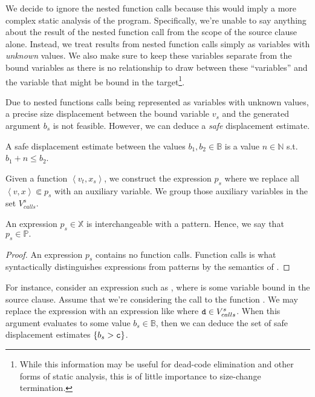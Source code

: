 We decide to ignore the nested function calls because this would imply a more
complex static analysis of the program. Specifically, we're unable to say
anything about the result of the nested function call from the scope of the
source clause alone. Instead, we treat results from nested function calls
simply as variables with \emph{unknown} values. We also make sure to keep these
variables separate from the bound variables as there is no relationship to draw
between these ``variables'' and the variable that might be bound in the
target\footnote{While this information may be useful for dead-code elimination
and other forms of static analysis, this is of little importance to size-change
termination.}.

Due to nested functions calls being represented as variables with unknown
values, a precise size displacement between the bound variable $v_s$ and the
generated argument $b_s$ is not feasible. However, we can deduce a \emph{safe}
displacement estimate.

\begin{definition} A safe displacement estimate between the values
$b_1,b_2\in\mathbb{B}$ is a value $n\in\mathbb{N}$ s.t. $b_1+n\leq
b_2$.\end{definition}

\begin{definition} Given a function $\left\langle v_t,x_s\right\rangle$, we
construct the expression $p_s$ where we replace all $\left\langle v,x
\right\rangle\Subset p_s$ with an auxiliary variable. We group those auxiliary
variables in the set $V^s_{calls}$.\end{definition} 

\begin{lemma} An expression $p_s\in\mathbb{X}$ is interchangeable with a
pattern. Hence, we say that $p_s\in\mathbb{P}.$\end{lemma}

\begin{proof} An expression $p_s$ contains no function calls. Function calls is
what syntactically distinguishes expressions from patterns by the semantics of
\D{}.\end{proof}

For instance, consider an expression such as , where 
is some variable bound in the source clause. Assume that we're considering the
call to the function . We may replace the expression 
with an expression like  where $\text{{\ttfamily d}}\in V^s_{calls}$. When this
argument evaluates to some value $b_s\in\mathbb{B}$, then we can deduce the set
of safe displacement estimates $\{b_s>\text{{\ttfamily c}}\}$.

